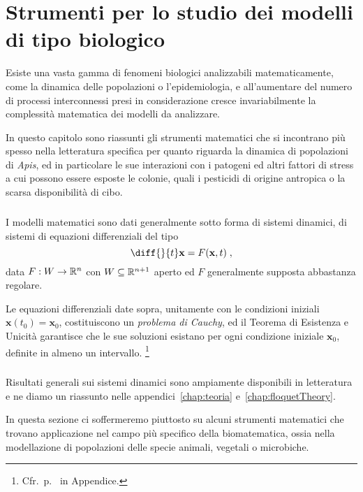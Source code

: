 \chapter[Strumenti per i modelli biologici]{Strumenti per lo studio dei modelli di tipo biologico}
\label{sec:ingredientiBioMat}

Esiste una vasta gamma di fenomeni biologici analizzabili matematicamente, come la dinamica delle popolazioni
o l'epidemiologia, e all'aumentare del numero di processi interconnessi presi in considerazione cresce
invariabilmente la complessità matematica dei modelli da analizzare.

In questo capitolo sono riassunti gli strumenti matematici che si incontrano più spesso nella letteratura
specifica per quanto riguarda la dinamica di popolazioni di \emph{Apis}, ed in particolare le sue interazioni
con i patogeni ed altri fattori di stress a cui possono essere esposte le colonie, quali i pesticidi di
origine antropica o la scarsa disponibilità di cibo.

\paragraph{}
I modelli matematici sono dati generalmente sotto forma di sistemi dinamici, \ie di sistemi di equazioni
differenziali del tipo
$$\diff{}{t} \mathbf{x} = F( \mathbf{x}, t ) \; ,$$
data $F: W \to \mathbb{R}^n$ con $W \subseteq \mathbb{R}^{n+1}$ aperto ed $F$ generalmente supposta abbastanza regolare.

Le equazioni differenziali date sopra, unitamente con le condizioni iniziali $\mathbf{x} (t_0) = \mathbf{x}_0$,
costituiscono un \emph{problema di Cauchy}, ed il Teorema di Esistenza e Unicità garantisce che le sue soluzioni
esistano per ogni condizione iniziale $\mathbf{x}_0$, definite in almeno un intervallo.
\footnote{Cfr.~p.~\pageref{eq:sdcGenerale} in Appendice.}

\paragraph{}
Risultati generali sui sistemi dinamici sono ampiamente disponibili in letteratura e ne diamo un riassunto
nelle appendici~\ref{chap:teoria} e~\ref{chap:floquetTheory}.

In questa sezione ci soffermeremo piuttosto su alcuni strumenti matematici che trovano applicazione nel campo
più specifico della biomatematica, ossia nella modellazione di popolazioni delle specie animali, vegetali
o microbiche.

